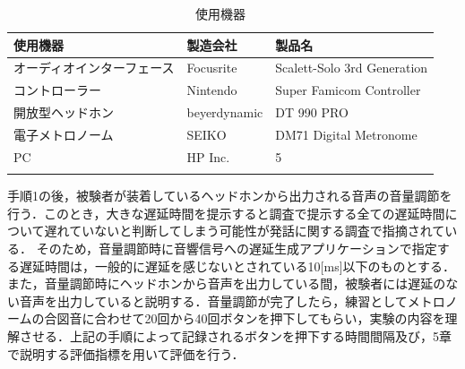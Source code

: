 \begin{table}[tbp]
  \caption{使用機器}
  \label{table:device}
  \centering
  \begin{tabular}{lll}
    \hline
    使用機器 & 製造会社 & 製品名\\
    \hline \hline
    オーディオインターフェース & Focusrite & Scalett-Solo 3rd Generation\\
    コントローラー  & Nintendo & Super Famicom Controller\\
    開放型ヘッドホン & beyerdynamic & DT 990 PRO\\
    電子メトロノーム  & SEIKO  & DM71 Digital Metronome \\
    PC  & HP Inc. & 5 \\
\\
    \hline
  \end{tabular}
\end{table}

手順1の後，被験者が装着しているヘッドホンから出力される音声の音量調節を行う．このとき，大きな遅延時間を提示すると調査で提示する全ての遅延時間について遅れていないと判断してしまう可能性が発話に関する調査で指摘されている\cite{Soturonn-takahashi}．
そのため，音量調節時に音響信号への遅延生成アプリケーションで指定する遅延時間は，一般的に遅延を感じないとされている10[ms]以下のものとする．また，音量調節時にヘッドホンから音声を出力している間，被験者には遅延のない音声を出力していると説明する．音量調節が完了したら，練習としてメトロノームの合図音に合わせて20回から40回ボタンを押下してもらい，実験の内容を理解させる．上記の手順によって記録されるボタンを押下する時間間隔及び，5章で説明する評価指標を用いて評価を行う．
